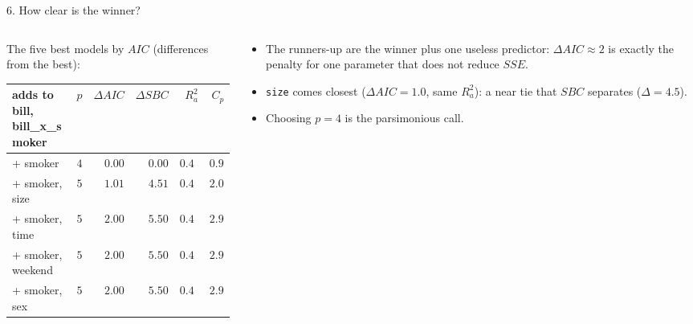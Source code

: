 \documentclass[aspectratio=169,11pt]{beamer}
\begin{document}
\begin{frame}{6. How clear is the winner?}
  \begin{columns}[T]
  \begin{column}{0.56\textwidth}
    \small
    The five best models by $AIC$ (differences from the best):

    \vspace{0.3em}
    {\scriptsize\setlength{\tabcolsep}{3pt}
    \begin{tabular}{@{}lrrrrr@{}}
      \toprule
      adds to bill, bill\_x\_smoker & $p$ & $\Delta AIC$ & $\Delta SBC$ & $R^2_a$ & $C_p$ \\
      \midrule
      + smoker           & $4$ & $0.00$ & $0.00$ & $0.4998$ & $0.97$ \\
      + smoker, size     & $5$ & $1.01$ & $4.51$ & $0.4998$ & $2.01$ \\
      + smoker, time     & $5$ & $2.00$ & $5.50$ & $0.4977$ & $2.97$ \\
      + smoker, weekend  & $5$ & $2.00$ & $5.50$ & $0.4977$ & $2.97$ \\
      + smoker, sex      & $5$ & $2.00$ & $5.50$ & $0.4977$ & $2.97$ \\
      \bottomrule
    \end{tabular}}
  \end{column}
  \begin{column}{0.44\textwidth}
    \small
    \begin{itemize}
      \item The runners-up are the winner plus one useless predictor:
            $\Delta AIC\approx2$ is exactly the penalty for one parameter that
            does not reduce $SSE$.
      \item \texttt{size} comes closest ($\Delta AIC=1.0$, same $R^2_a$): a
            near tie that $SBC$ separates ($\Delta=4.5$).
      \item Choosing $p=4$ is the parsimonious call.
    \end{itemize}
  \end{column}
  \end{columns}
\end{frame}
\end{document}
